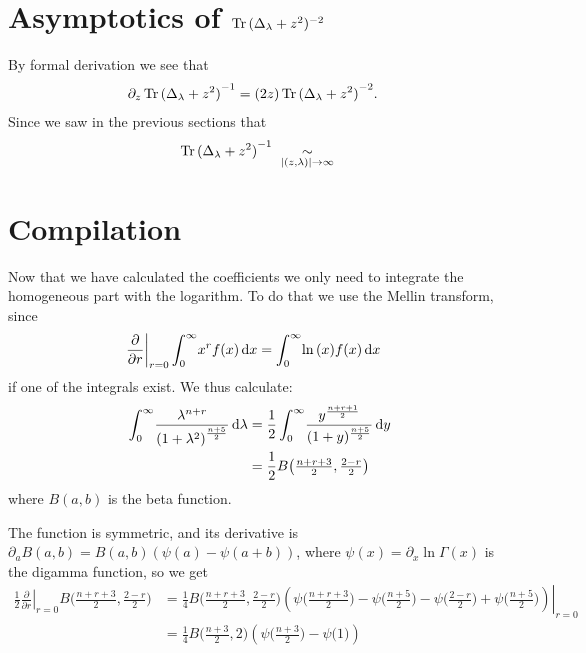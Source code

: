 \section{Asymptotics of $\Tr{(\Delta_\lambda + z^2)^{-2}}$}
By formal derivation we see that
\begin{align*}
    \partial_z\Tr{(\Delta_\lambda + z^2)}^{-1} &=
        (2z) \Tr{(\Delta_\lambda + z^2)}^{-2}.
\end{align*}
Since we saw in the previous sections that
\begin{align*}
    \Tr{(\Delta_\lambda + z^2)}^{-1}
    \ \SimAs{\Abs{(z,\lambda)}\to\infty}\ 
\end{align*}

\section{Compilation}
Now that we have calculated the coefficients we only need to integrate the
homogeneous part with the logarithm. To do that we use the Mellin transform,
since
\begin{align*}
    \left.\frac\partial{\partial r}\right|_{r=0}\Integ[\infty]{0}{x}{x^r f(x)}
    &= \Integ[\infty]{0}{x}{\ln{(x)} f(x)}
\end{align*}
if one of the integrals exist. We thus calculate:
\begin{align*}
    \Integ[\infty]{0}{\lambda}{\frac{\lambda^{n + r}}{\left(1 +
    \lambda^2\right)^{\frac{n+5}{2}}}} &=
    \frac12\Integ[\infty]{0}{y}{\frac{y^{\frac{n+r+1}{2}}}{(1 +
    y)^{\frac{n+5}{2}}}} \\
    &= \frac12 B\bigl(\tfrac{n+r+3}{2}, \tfrac{2-r}{2}\bigr)
\end{align*}
where $B(a,b)$ is the beta function. %

The function is symmetric, and its
derivative is $\partial_a B(a,b) = B(a,b) (\psi(a) - \psi(a+b))$, where
$\psi(x) = \partial_x \ln\Gamma(x)$ is the digamma function, so we get
\begin{align*}
    \left.\frac12\frac\partial{\partial r}\right|_{r=0} B\bigl(\tfrac{n+r+3}{2},
    \tfrac{2-r}{2}\bigr)
    &= \left.\frac14 B\bigl(\tfrac{n+r+3}{2}, \tfrac{2-r}{2}\bigr)
    \left(\psi\bigl(\tfrac{n+r+3}{2}\bigr) - \psi\bigl(\tfrac{n+5}{2}\bigr) -
    \psi\bigl(\tfrac{2-r}{2}\bigr) +
    \psi\bigl(\tfrac{n+5}{2}\bigr)\right)\right|_{r=0} \\
    &= \frac14 B\bigl(\tfrac{n+3}{2}, 2\bigr)
    \left(\psi\bigl(\tfrac{n+3}{2}\bigr) - \psi\bigl(1\bigr)\right)
\end{align*}

